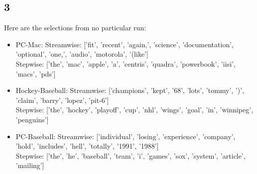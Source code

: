 \documentclass{article}
\begin{document}
\subsection{3}
Here are the selections from no particular run:

\begin{itemize}
  \item PC-Mac: Streamwise: ['fit', 'recent', 'again,', 'science', 'documentation', 'optional', 'one,', 'audio', 'motorola', '(like']\\
Stepwise: ['the', 'mac', 'apple', 'a', 'centris', 'quadra', 'powerbook', 'iisi', 'macs', 'pds']

\item Hockey-Baseball: Streamwise: ['champions', 'kept', '68', 'lots', 'tommy', ')', 'claim', 'barry', 'lopez', 'pit-6']\\
Stepwise: ['the', 'hockey', 'playoff', 'cup', 'nhl', 'wings', 'goal', 'in', 'winnipeg', 'penguins']

\item PC-Baseball: Streamwise: ['individual', 'losing', 'experience', 'company', 'hold', 'includes', 'hell', 'totally', '1991', '1988']\\
Stepwise: ['the', 'he', 'baseball', 'team', 'i', 'games', 'sox', 'system', 'article', 'mailing']
\end{itemize}
\end{document}
